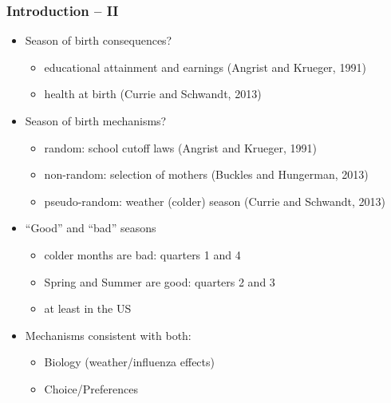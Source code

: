\documentclass[10pt,letterpaper,subeqn]{beamer}
\begin{document}
\begin{frame}
\frametitle{Introduction -- II}
\begin{itemize}
\item Season of birth consequences?
\begin{itemize}
\item educational attainment and earnings (Angrist and Krueger, 1991)
\item health at birth (Currie and Schwandt, 2013)
\end{itemize}
\item Season of birth mechanisms?
\begin{itemize}
\item random: school cutoff laws (Angrist and Krueger, 1991)
\item non-random: selection of mothers (Buckles and Hungerman, 2013)
\item pseudo-random: weather (colder) season (Currie and Schwandt, 2013)
\end{itemize}
\item ``Good'' and ``bad'' seasons
\begin{itemize}
\item colder months are bad: quarters 1 and 4
\item Spring and Summer are good: quarters 2 and 3
\item at least in the US
\end{itemize}
\item Mechanisms consistent with both: 
\begin{itemize}
\item Biology (weather/influenza effects)
\item Choice/Preferences 
\end{itemize}
\end{itemize}
\end{frame}
\end{document}
